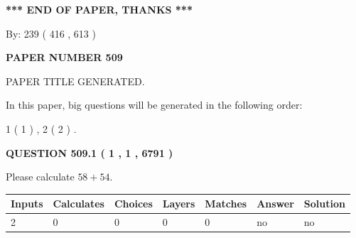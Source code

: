 \documentclass[12pt]{article}
\begin{document}
   
\vspace{1.0in} 
{\textbf{\large{ *** END OF PAPER, THANKS *** }}} 
   
   
\hspace{1.0in} By: 
 239 ( 416 ,  613 )
   
   
   
   
\newpage 
\setcounter{page}{ 
   509001 } 
   
   
   
   
 {\textbf{ \Large{ PAPER NUMBER  509  }}}
   
   
\vspace{0.2in}
   
   
   
   
   
   
   
   
 \vspace{0.2in}
 
 
 
 
   
   
 PAPER TITLE GENERATED.
   
   
   
\vspace{0.2in}
   
In this paper, big questions will be generated in the following order: 
   
   
   1 ( 1 )
 ,
   2 ( 2 )
 .
  
\vspace{0.2in}
  
{\textbf{\Large{QUESTION
509.1 
 ( 1 , 1 , 6791 )
}}}
  
  
 
Please calculate $ %
58 +  %
54 $.
 
 
   
   
   
   
\noindent\begin{tabular}{|l|l|l|l|l|l|l|}
 \hline
Inputs & Calculates & Choices & Layers & Matches & Answer & Solution \\ \hline
 2  & 
 0  & 
 0
  & 
 0  & 
 0  & 
  no & 
  no 
  \\ \hline
 \end{tabular}
   
   
   
   
\noindent{}
   
\end{document}

